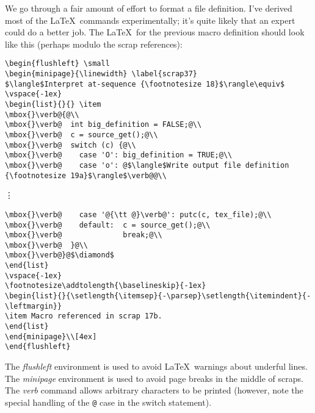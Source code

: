 \documentclass{report}
\begin{document}
We go through a fair amount of effort to format a file definition.
I've derived most of the \LaTeX\ commands experimentally; it's quite
likely that an expert could do a better job. The \LaTeX\ for
the previous macro definition should look like this (perhaps modulo
the scrap references):
{\small
\begin{verbatim}
\begin{flushleft} \small
\begin{minipage}{\linewidth} \label{scrap37}
$\langle$Interpret at-sequence {\footnotesize 18}$\rangle\equiv$
\vspace{-1ex}
\begin{list}{}{} \item
\mbox{}\verb@{@\\
\mbox{}\verb@  int big_definition = FALSE;@\\
\mbox{}\verb@  c = source_get();@\\
\mbox{}\verb@  switch (c) {@\\
\mbox{}\verb@    case 'O': big_definition = TRUE;@\\
\mbox{}\verb@    case 'o': @$\langle$Write output file definition {\footnotesize 19a}$\rangle$\verb@@\\
\end{verbatim}
\vdots
\begin{verbatim}
\mbox{}\verb@    case '@{\tt @}\verb@': putc(c, tex_file);@\\
\mbox{}\verb@    default:  c = source_get();@\\
\mbox{}\verb@              break;@\\
\mbox{}\verb@  }@\\
\mbox{}\verb@}@$\diamond$
\end{list}
\vspace{-1ex}
\footnotesize\addtolength{\baselineskip}{-1ex}
\begin{list}{}{\setlength{\itemsep}{-\parsep}\setlength{\itemindent}{-\leftmargin}}
\item Macro referenced in scrap 17b.
\end{list}
\end{minipage}\\[4ex]
\end{flushleft}
\end{verbatim}}

\noindent
The {\em flushleft\/} environment is used to avoid \LaTeX\ warnings
about underful lines. The {\em minipage\/} environment is used to
avoid page breaks in the middle of scraps. The {\em verb\/} command
allows arbitrary characters to be printed (however, note the special
handling of the \verb|@| case in the switch statement).
\end{document}
